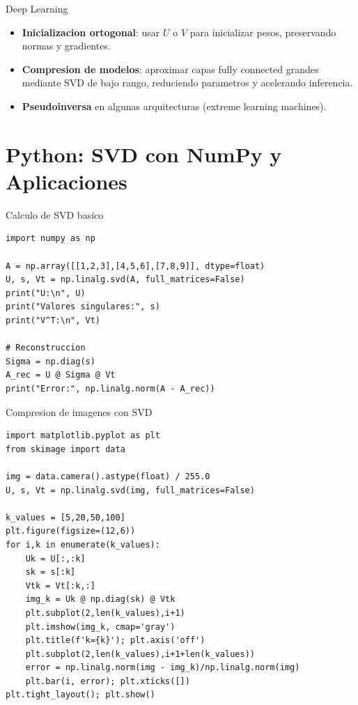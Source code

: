 \documentclass[aspectratio=169, 10pt, xcolor=table]{beamer}
\begin{document}
\begin{frame}{Deep Learning}
    \begin{itemize}
        \item \textbf{Inicializacion ortogonal}: usar $U$ o $V$ para inicializar pesos, preservando normas y gradientes.
        \item \textbf{Compresion de modelos}: aproximar capas fully connected grandes mediante SVD de bajo rango, reduciendo parametros y acelerando inferencia.
        \item \textbf{Pseudoinversa} en algunas arquitecturas (extreme learning machines).
    \end{itemize}
\end{frame}

\section{Python: SVD con NumPy y Aplicaciones}

\begin{frame}[fragile]{Calculo de SVD basico}
    \begin{lstlisting}
import numpy as np

A = np.array([[1,2,3],[4,5,6],[7,8,9]], dtype=float)
U, s, Vt = np.linalg.svd(A, full_matrices=False)
print("U:\n", U)
print("Valores singulares:", s)
print("V^T:\n", Vt)

# Reconstruccion
Sigma = np.diag(s)
A_rec = U @ Sigma @ Vt
print("Error:", np.linalg.norm(A - A_rec))
    \end{lstlisting}
\end{frame}

\begin{frame}[fragile]{Compresion de imagenes con SVD}
    \begin{lstlisting}
import matplotlib.pyplot as plt
from skimage import data

img = data.camera().astype(float) / 255.0
U, s, Vt = np.linalg.svd(img, full_matrices=False)

k_values = [5,20,50,100]
plt.figure(figsize=(12,6))
for i,k in enumerate(k_values):
    Uk = U[:,:k]
    sk = s[:k]
    Vtk = Vt[:k,:]
    img_k = Uk @ np.diag(sk) @ Vtk
    plt.subplot(2,len(k_values),i+1)
    plt.imshow(img_k, cmap='gray')
    plt.title(f'k={k}'); plt.axis('off')
    plt.subplot(2,len(k_values),i+1+len(k_values))
    error = np.linalg.norm(img - img_k)/np.linalg.norm(img)
    plt.bar(i, error); plt.xticks([])
plt.tight_layout(); plt.show()
    \end{lstlisting}
\end{frame}
\end{document}
